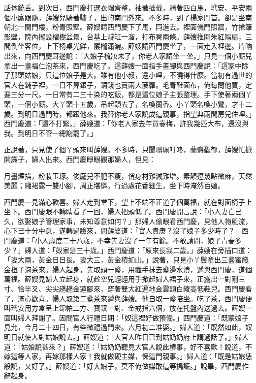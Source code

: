 \begin{showcontents}{}
話休饒舌。到次日，西門慶打選衣帽齊整，袖著插戴，騎著匹白馬，玳安、平安兩個小廝跟隨，薛嫂兒騎著驢子，出的南門外來。不多時，到了楊家門首。卻是坐南朝北一間門樓，粉青照壁。薛嫂請西門慶下了馬，同進去。裡面儀門照牆，竹搶籬影壁，院內擺設榴樹盆景，台基上靛缸一溜，打布凳兩條。薛嫂推開朱紅隔扇，三間倒坐客位，上下椅桌光鮮，簾櫳瀟灑。薛嫂請西門慶坐了，一面走入裡邊。片晌出來，向西門慶耳邊說：「大娘子梳妝未了，你老人家請坐一坐。」只見一個小廝兒拿出一盞福仁泡茶來，西門慶吃了。這薛嫂一面指手畫腳與西門慶說：「這家中除了那頭姑娘，只這位娘子是大。雖有他小叔，還小哩，不曉得什麼。當初有過世的官人在鋪子裡，一日不算銀子，銅錢也賣兩大菠籮。毛青鞋面布，俺每問他買，定要三分一尺。一日常有二三十染的吃飯，都是這位娘子主張整理。手下使著兩個丫頭，一個小廝。大丫頭十五歲，吊起頭去了，名喚蘭香。小丫頭名喚小鸞，才十二歲。到明日過門時，都跟他來。我替你老人家說成這親事，指望典兩間房兒住哩。」西門慶道：「這不打緊。」薛嫂道：「你老人家去年買春梅，許我幾匹大布，還沒與我。到明日不管一總謝罷了。」

正說著，只見使了個丫頭來叫薛嫂。不多時，只聞環珮叮咚，蘭麝馥郁，薛嫂忙掀開簾子，婦人出來。西門慶睜眼觀那婦人，但見：

月畫煙描，粉妝玉琢。俊龐兒不肥不瘦，俏身材難減難增。素額逗幾點微麻，天然美麗；緗裙露一雙小腳，周正堪憐。行過處花香細生，坐下時淹然百媚。

西門慶一見滿心歡喜。婦人走到堂下，望上不端不正道了個萬福，就在對面椅子上坐下。西門慶眼不轉睛看了一回，婦人把頭低了。西門慶開言說：「小人妻亡已久，欲娶娘子管理家事，未知尊意如何？」那婦人偷眼看西門慶，見他人物風流，心下已十分中意，遂轉過臉來，問薛婆道：「官人貴庚？沒了娘子多少時了？」西門慶道：「小人虛度二十八歲，不幸先妻沒了一年有餘。不敢請問，娘子青春多少？」婦人道：「奴家是三十歲。」西門慶道：「原來長我二歲。」薛嫂在旁插口道：「妻大兩，黃金日日長。妻大三，黃金積如山。」說著，只見小丫鬟拿出三盞蜜餞金橙子泡茶來。婦人起身，先取頭一盞，用纖手抹去盞邊水漬，遞與西門慶，道個萬福。薛嫂見婦人立起身，就趁空兒輕輕用手掀起婦人裙子來，正露出一對剛三寸、恰半叉、尖尖趫趫金蓮腳來，穿著雙大紅遍地金雲頭白綾高低鞋兒。西門慶看了，滿心歡喜。婦人取第二盞茶來遞與薛嫂。他自取一盞陪坐。吃了茶，西門慶便叫玳安用方盒呈上錦帕二方、寶釵一對、金戒指六個，放在托盤內送過去。薛嫂一面叫婦人拜謝了。因問官人行禮日期：「奴這裡好做預備。」西門慶道：「既蒙娘子見允，今月二十四日，有些微禮過門來。六月初二准娶。」婦人道：「既然如此，奴明日就使人對姑娘說去。」薛嫂道：「大官人昨日已到姑奶奶府上講過話了。」婦人道：「姑娘說甚來？」薛嫂道：「姑奶奶聽見大官人說此椿事，好不喜歡！說道，不嫁這等人家，再嫁那樣人家！我就做硬主媒，保這門親事。」婦人道：「既是姑娘恁般說，又好了。」薛嫂道：「好大娘子，莫不俺做媒敢這等搗謊。」說畢，西門慶作辭起身。


\end{showcontents}
